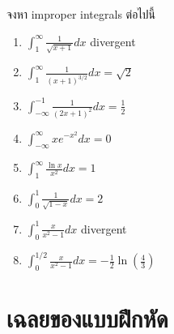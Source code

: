 \documentclass[
]{book}
\begin{document}
จงหา improper integrals ต่อไปนี้

\begin{enumerate}
\def\labelenumi{\arabic{enumi}.}
\item
  \(\int_{1}^{\infty} \frac{1}{\sqrt{x+1}} dx\) divergent
\item
  \(\int_{1}^{\infty} \frac{1}{(x+1)^{3/2}}dx = \sqrt{2}\)
\item
  \(\int_{-\infty}^{-1} \frac{1}{(2x + 1)^2} dx = \frac{1}{2}\)
\item
  \(\int_{-\infty}^{\infty} x e^{-x^2} dx = 0\)
\item
  \(\int_{1}^{\infty} \frac{\ln x}{x^2}  dx = 1\)
\item
  \(\int_0^1 \frac{1}{\sqrt{1-x}} dx = 2\)
\item
  \(\int_0^{1} \frac{x}{x^2-1} dx\) divergent
\item
  \(\int_0^{1/2} \frac{x}{x^2-1} dx = -\frac{1}{2} \ln (\frac{4}{3})\)
\end{enumerate}

\chapter{เฉลยของแบบฝึกหัด}\label{uxe40uxe09uxe25uxe22uxe02uxe2duxe07uxe41uxe1auxe1auxe1duxe01uxe2buxe14}
\end{document}
